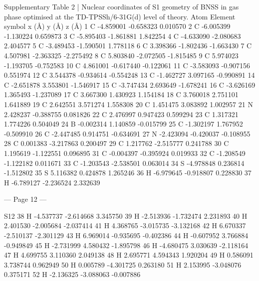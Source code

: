 
Supplementary Table 2 | Nuclear coordinates of S1 geometry of BNSS in gas phase optimised 
at the TD-TPSSh/6-31G(d) level of theory. 
Atom 
Element symbol 
x (Å)        
y (Å)       
z (Å)        
1 
C 
-4.859001  
-0.658323  
0.010570  
2 
C 
-6.005399  
-1.130224  
0.659873  
3 
C 
-5.895403  
-1.861881  
1.842254  
4 
C 
-4.633090  
-2.080683  
2.404577  
5 
C 
-3.489453  
-1.590501  
1.778118  
6 
C 
3.398366  
-1.802436  
-1.663430  
7 
C 
4.507981  
-2.363325  
-2.275492  
8 
C 
5.803840  
-2.072505  
-1.815485  
9 
C 
5.974023  
-1.193705  
-0.752583  
10 
C 
4.861001  
-0.617440  
-0.122061  
11 
C 
-3.583093  
-0.907156  
0.551974  
12 
C 
3.544378  
-0.934614  
-0.554248  
13 
C 
-1.462727  
3.097165  
-0.990891  
14 
C 
-2.651878  
3.553801  
-1.546917  
15 
C 
-3.747434  
2.693649  
-1.678241  
16 
C 
-3.626169  
1.365493  
-1.237089  
17 
C 
3.667300  
1.430923  
1.154184  
18 
C 
3.760018  
2.751101  
1.641889  
19 
C 
2.642551  
3.571274  
1.558308  
20 
C 
1.451475  
3.083892  
1.002957  
21 
N 
2.428237  
-0.388755  
0.081826  
22 
C 
2.476997  
0.947423  
0.599294  
23 
C 
1.317321  
1.774226  
0.504049  
24 
B 
-0.002314  
1.140859  
-0.015799  
25 
C 
-1.302197  
1.767952  
-0.509910  
26 
C 
-2.447485  
0.914751  
-0.634691  
27 
N 
-2.423094  
-0.420037  
-0.108955  
28 
C 
0.001383  
-3.217863  
0.200497  
29 
C 
1.217762  
-2.515777  
0.241788  
30 
C 
1.195619  
-1.122551  
0.096895  
31 
C 
-0.004397  
-0.395924  
0.019933  
32 
C 
-1.208549  
-1.122182  
0.011671  
33 
C 
-1.203543  
-2.538501  
0.063014  
34 
S 
-4.978848  
0.236814  
-1.512802  
35 
S 
5.116382  
0.424878  
1.265246  
36 
H 
-6.979645  
-0.918807  
0.228830  
37 
H 
-6.789127  
-2.236524  
2.332639  


--- Page 12 ---
 
S12 
38 
H 
-4.537737  
-2.614668  
3.345750  
39 
H 
-2.513936  
-1.732474  
2.231893  
40 
H 
2.401530  
-2.005684  
-2.037414  
41 
H 
4.368765  
-3.015735  
-3.132168  
42 
H 
6.670337  
-2.510137  
-2.301129  
43 
H 
6.969014  
-0.935695  
-0.402386  
44 
H 
-0.607952  
3.766884  
-0.949849  
45 
H 
-2.731999  
4.580432  
-1.895798  
46 
H 
-4.680475  
3.030639  
-2.118164  
47 
H 
4.699755  
3.110360  
2.049138  
48 
H 
2.695771  
4.594343  
1.920204  
49 
H 
0.586091  
3.738744  
0.962949  
50 
H 
0.005789  
-4.301725  
0.263180  
51 
H 
2.153995  
-3.048076  
0.375171  
52 
H 
-2.136325  
-3.088063  
-0.007886  
 
